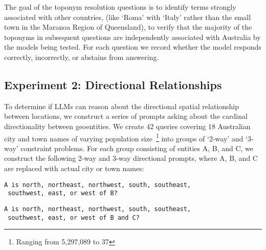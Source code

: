\noindent The goal of the toponym resolution questions is to identify terms strongly associated with other countries, (like `Roma' with `Italy' rather than the small town in the Maranoa Region of Queensland), to verify that the majority of the toponyms in subsequent questions are independently associated with Australia by the models being tested.
For each question we record whether the model responds correctly, incorrectly, or abstains from answering.



\subsection{Experiment 2: Directional Relationships}

To determine if LLMs can reason about the directional spatial relationship between locations, we construct a series of prompts asking about the cardinal directionality between geoentities.
We create $42$ queries covering $18$ Australian city and town names of varying population size~\footnote{Ranging from 5,297,089 to 37} into groups of `2-way' and `3-way' constraint problems.
For each group consisting of entities A, B, and C, we construct the following 2-way and 3-way directional prompts, where A, B, and C are replaced with actual city or town names: 

\begin{lstlisting}[title=Prompt 3: 2-way Directional Prompt]
 A is north, northeast, northwest, south, southeast, 
 southwest, east, or west of B?
\end{lstlisting}

\begin{lstlisting}[title=Prompt 4: 3-way Directional Prompt]
 A is north, northeast, northwest, south, southeast, 
 southwest, east, or west of B and C?
\end{lstlisting}

